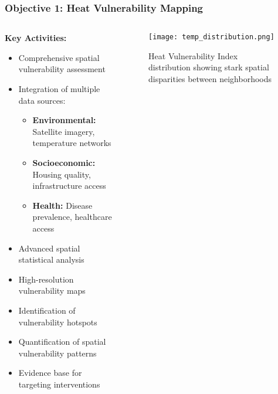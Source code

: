 \documentclass[aspectratio=169]{beamer}
\newcommand{\concept}[1]{\textcolor{witsteal}{\textbf{#1}}}
\begin{document}
\begin{frame}
    \frametitle{Objective 1: Heat Vulnerability Mapping}
    
    \begin{columns}[T]
        \begin{column}{0.55\textwidth}
            \textbf{\large Key Activities:}
            \begin{itemize}[leftmargin=*, itemsep=6pt]
                \item Comprehensive spatial vulnerability assessment
                \item Integration of multiple data sources:
                \begin{itemize}[itemsep=4pt]
                    \item \concept{Environmental:} Satellite imagery, temperature networks
                    \item \concept{Socioeconomic:} Housing quality, infrastructure access
                    \item \concept{Health:} Disease prevalence, healthcare access
                \end{itemize}
                \item Advanced spatial statistical analysis
            \end{itemize}
            
            \begin{impactbox}
                \begin{itemize}[leftmargin=*, itemsep=6pt]
                    \item High-resolution vulnerability maps
                    \item Identification of vulnerability hotspots
                    \item Quantification of spatial vulnerability patterns
                    \item Evidence base for targeting interventions
                \end{itemize}
            \end{impactbox}
        \end{column}
        \begin{column}{0.42\textwidth}
            \begin{figure}
                \texttt{[image: temp\_distribution.png]}
                \caption{\small Heat Vulnerability Index distribution showing stark spatial disparities between neighborhoods}
            \end{figure}
        \end{column}
    \end{columns}
\end{frame}
\end{document}
